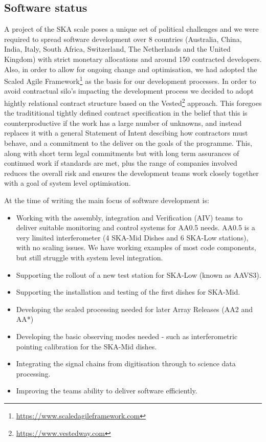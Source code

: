 \documentclass[a4paper,
               biblatex,     %
               keeplastbox,   %
               ]{jacow}
\begin{document}
\subsection{Software status}
A project of the SKA scale poses a unique set of political challenges and we were required to spread software development over 8 countries (Australia, China, India, Italy, South Africa, Switzerland, The Netherlands and the United Kingdom) with strict monetary allocations and around 150 contracted developers. Also, in order to allow for ongoing change and optimisation, we had adopted the Scaled Agile Framework\footnote{\url{https://www.scaledagileframework.com}} as the basis for our development processes. In order to avoid contractual silo's impacting the development process we decided to adopt hightly relational contract structure based on the Vested\footnote{\url{https://www.vestedway.com}} approach. This foregoes the tradititional tightly defined contract specification in the belief that this is counterproductive if the work has a large number of unknowns, and instead replaces it with a general Statement of Intent descibing how contractors must behave, and a commitment to the deliver on the goals of the programme. This, along with short term legal commitments but with long term assurances of continued work if standards are met, plus the range of companies involved reduces the overall risk and ensures the development teams work closely together with a goal of system level optimisation.

At the time of writing the main focus of software development is:
\begin{itemize}
  \item Working with the assembly, integration and Verification (AIV) teams to deliver suitable monitoring and control systems for AA0.5 needs. AA0.5 is a very limited interferometer (4 SKA-Mid Dishes and 6 SKA-Low stations), with no scaling issues. We have working examples of most code components, but still struggle with system level integration. 
  \item Supporting the rollout of a new test station for SKA-Low (known as AAVS3).
  \item Supporting the installation and testing of the first dishes for SKA-Mid.
  \item Developing the scaled processing needed for later Array Releases (AA2 and AA*)
  \item Developing the basic observing modes needed - such as interferometric pointing calibration for the SKA-Mid dishes.
  \item Integrating the signal chains from digitisation through to science data processing.
  \item Improving the teams ability to deliver software efficiently.
\end{itemize}
\end{document}
